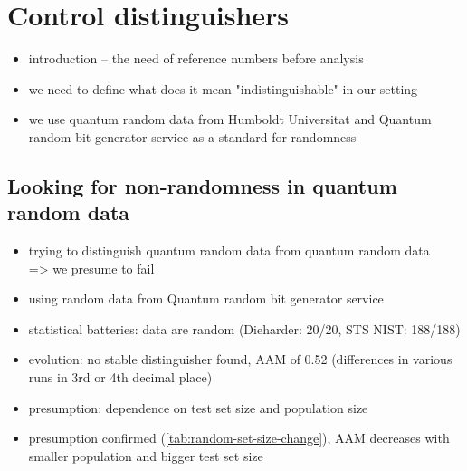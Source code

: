 \documentclass[12pt,oneside]{fithesis2}
\begin{document}
\chapter{Control distinguishers}
\label{chap:distinguish-control}

\begin{itemize}
\item introduction -- the need of reference numbers before analysis
\item we need to define what does it mean "indistinguishable" in our setting
\item we use quantum random data from Humboldt Universitat and Quantum random bit generator service as a standard for randomness
\end{itemize}

\section{Looking for non-randomness in quantum random data}
\label{sec:control-random-random}

\begin{itemize}
\item trying to distinguish quantum random data from quantum random data \\ => we presume to fail
\item using random data from Quantum random bit generator service
\item statistical batteries: data are random (Dieharder: 20/20, STS NIST: 188/188)
\item evolution: no stable distinguisher found, AAM of 0.52 (differences in various runs in 3rd or 4th decimal place)
\item presumption: dependence on test set size and population size
\item presumption confirmed (\autoref{tab:random-set-size-change}), AAM decreases with smaller population and bigger test set size
\end{itemize}
\end{document}
